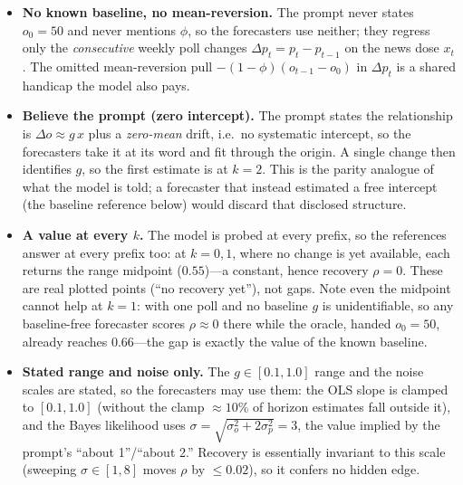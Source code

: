 \begin{itemize}
\item \textbf{No known baseline, no mean-reversion.}  The prompt never states $o_0{=}50$ and never
mentions $\phi$, so the forecasters use neither; they regress only the \emph{consecutive} weekly
poll changes $\Delta p_t = p_t - p_{t-1}$ on the news dose $x_t$.  The omitted mean-reversion pull
$-(1-\phi)(o_{t-1}-o_0)$ in $\Delta p_t$ is a shared handicap the model also pays.
\item \textbf{Believe the prompt (zero intercept).}  The prompt states the relationship is
$\Delta o\approx g\,x$ plus a \emph{zero-mean} drift, i.e.\ no systematic intercept, so the
forecasters take it at its word and fit through the origin.  A single change then identifies $g$, so
the first estimate is at $k{=}2$.  This is the parity analogue of what the model is told; a
forecaster that instead estimated a free intercept (the baseline reference below) would discard that
disclosed structure.
\item \textbf{A value at every $k$.}  The model is probed at every prefix, so the references answer
at every prefix too: at $k=0,1$, where no change is yet available, each returns the range midpoint
($0.55$)---a constant, hence recovery $\rho=0$.  These are real plotted points (``no recovery yet''),
not gaps.  Note even the midpoint cannot help at $k{=}1$: with one poll and no baseline $g$ is
unidentifiable, so any baseline-free forecaster scores $\rho\approx0$ there while the oracle, handed
$o_0{=}50$, already reaches $0.66$---the gap is exactly the value of the known baseline.
\item \textbf{Stated range and noise only.}  The $g\in[0.1,1.0]$ range and the noise scales are
stated, so the forecasters may use them: the OLS slope is clamped to $[0.1,1.0]$ (without the clamp
$\approx10\%$ of horizon estimates fall outside it), and the Bayes likelihood uses
$\sigma=\sqrt{\sigma_o^2+2\sigma_p^2}=3$, the value implied by the prompt's ``about 1''/``about
2.''  Recovery is essentially invariant to this scale (sweeping $\sigma\in[1,8]$ moves $\rho$ by
$\leq0.02$), so it confers no hidden edge.
\end{itemize}

